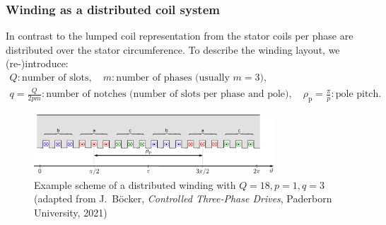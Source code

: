 \begin{frame}
	\frametitle{Winding as a distributed coil system}
    In contrast to the lumped coil representation from  the stator coils per phase are distributed over the stator circumference. To describe the winding layout, we (re-)introduce:
    \begin{gather*}
		Q: \mbox{number of slots}, \quad m: \mbox{number of phases (usually $m=3$)}, \\ q=\frac{Q}{2 p m}: \mbox{number of notches  (number of slots per phase and pole)}, \quad \rho_\mathrm{p} = \frac{\pi}{p}: \mbox{pole pitch.}
	\end{gather*}
    \begin{figure}
        \centering
        \includegraphics[width=0.8\textwidth]{fig/lec05/Scheme_distributed_winding.pdf}
        \caption{Example scheme of a distributed winding with $Q=18, p = 1, q=3$ (adapted from J.~B\"ocker, \textit{Controlled Three-Phase Drives}, Paderborn University, 2021)}
        \label{fig:Scheme_distributed_winding}
    \end{figure}
\end{frame}


